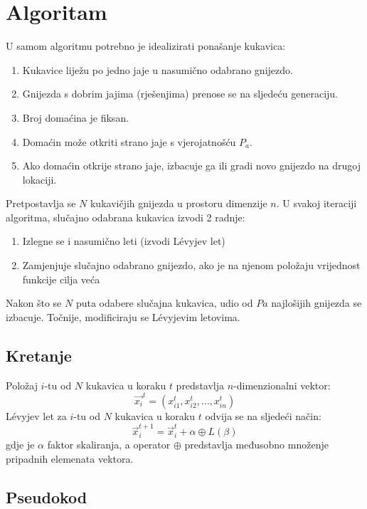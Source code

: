 \section{Algoritam}
U samom algoritmu potrebno je idealizirati ponašanje kukavica:
\begin{enumerate}
	\item Kukavice liježu po jedno jaje u nasumično odabrano gnijezdo.
        \item Gnijezda s dobrim jajima (rješenjima) prenose se na sljedeću generaciju.
	\item Broj domaćina je fiksan.
        \item Domaćin može otkriti strano jaje s vjerojatnošću $P_a$.
        \item Ako domaćin otkrije strano jaje, izbacuje ga ili gradi novo gnijezdo na drugoj lokaciji.
\end{enumerate}

Pretpostavlja se $N$ kukavičjih gnijezda u prostoru dimenzije $n$. U svakoj iteraciji algoritma, slučajno odabrana kukavica izvodi 2 radnje:
\begin{enumerate}
    \item Izlegne se i nasumično leti (izvodi L\'evyjev let)
    \item Zamjenjuje slučajno odabrano gnijezdo, ako je na njenom položaju vrijednost funkcije cilja veća
\end{enumerate}

Nakon što se $N$ puta odabere slučajna kukavica, udio od $Pa$ najlošijih gnijezda se izbacuje. Točnije, modificiraju se L\'evyjevim letovima.


\subsection{Kretanje}
Položaj $i$-tu od $N$ kukavica u koraku $t$ predstavlja $n$-dimenzionalni vektor:
\begin{equation}
	\vec{x_i}^t = (x_{i1}^t, x_{i2}^t, \dots, x_{in}^t)
\end{equation}
L\'evyjev let za $i$-tu od $N$ kukavica u koraku $t$ odvija se na sljedeći način:
\begin{equation}
    \vec{x}_i^{t+1} = \vec{x}_i^{t} + \alpha \oplus L(\beta)
\end{equation}
gdje je $\alpha$ faktor skaliranja, a operator $\oplus$ predstavlja međusobno množenje pripadnih elemenata vektora.


\subsection{Pseudokod}


